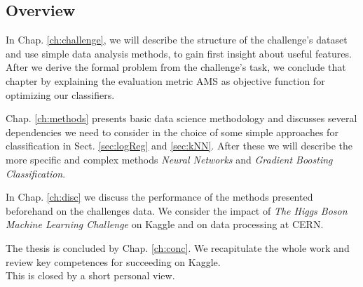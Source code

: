 \subsection{Overview}
In Chap. \ref{ch:challenge}, we will describe the structure of the challenge's dataset \cite{higgsData} and use simple data analysis methods, to gain first insight about useful features.
After we derive the formal problem from the challenge's task, we conclude that chapter by explaining the evaluation metric AMS as objective function for optimizing our classifiers. 

Chap. \ref{ch:methods} presents basic data science methodology and discusses several dependencies we need to consider in the choice of some simple approaches for classification in Sect. \ref{sec:logReg} and \ref{sec:kNN}. After these we will describe the more specific and complex methods \emph{Neural Networks} and \emph{Gradient Boosting Classification}.

In Chap. \ref{ch:disc} we discuss the performance of the methods presented beforehand on the challenges data. We consider the impact of \emph{The Higgs Boson Machine Learning Challenge} on Kaggle and on data processing at CERN.

The thesis is concluded by Chap. \ref{ch:conc}. We recapitulate the whole work and review key competences for succeeding on Kaggle.\\
This is closed by a short personal view.
\pagebreak
\clearpage

	{\pagebreak \thispagestyle{empty} \cleardoublepage}{\clearpage}